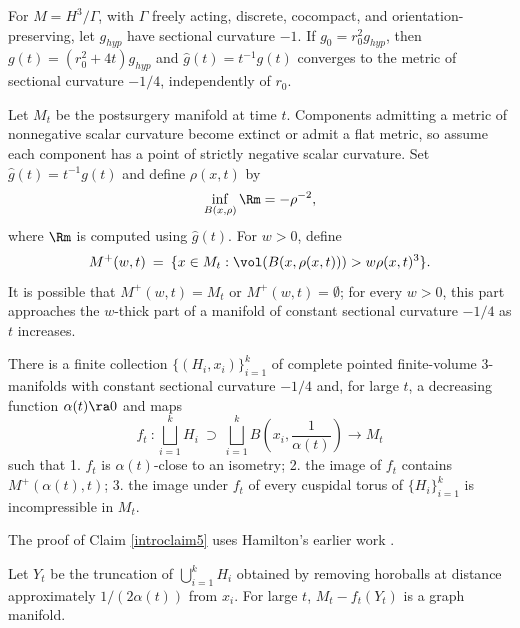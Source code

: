 For $M=H^3/\Gamma$, with $\Gamma$ freely acting, discrete, cocompact, and
orientation-preserving, let $g_{hyp}$ have sectional curvature $-1$.  If
$g_0=r_0^2g_{hyp}$, then
$g(t)=(r_0^2+4t)g_{hyp}$ and
$\widehat g(t)=t^{-1}g(t)$ converges to the metric of sectional curvature
$-1/4$, independently of $r_0$.

Let $M_t$ be the postsurgery manifold at time $t$.  Components admitting a
metric of nonnegative scalar curvature become extinct or admit a flat metric,
so assume each component has a point of strictly negative scalar curvature.
Set $\widehat g(t)=t^{-1}g(t)$ and define $\rho(x,t)$ by
\[
\inf_{B(x,\rho)}\Rm=-\rho^{-2},
\]
where $\Rm$ is computed using $\widehat g(t)$.  For $w>0$, define
\begin{equation}
M^+(w,t)\: =\:
\{x\in M_t:\vol(B(x,\rho(x,t)))>w\rho(x,t)^3\}.
\end{equation}
It is possible that $M^+(w,t)=M_t$ or $M^+(w,t)=\emptyset$; for every
$w>0$, this part approaches the $w$-thick part of a manifold of constant
sectional curvature $-1/4$ as $t$ increases.

\begin{proposition}
  \label{prop:kl-overview-ricci-flow-approach-manifold-geometrization-existence-sectional-curvature}
 \cite{Perelman2} \label{introclaim5}
There is a finite collection $\{(H_i,x_i)\}_{i=1}^k$ of complete pointed
finite-volume $3$-manifolds with constant sectional curvature $-1/4$ and, for
large $t$, a decreasing function $\alpha(t)\ra0$ and maps
\begin{equation}
f_t\: :\bigsqcup_{i=1}^kH_i\:\supset\:
\bigsqcup_{i=1}^k B\left(x_i,\frac{1}{\alpha(t)}\right)\longrightarrow M_t
\end{equation}
such that
1. $f_t$ is $\alpha(t)$-close to an isometry;
2. the image of $f_t$ contains $M^+(\alpha(t),t)$;
3. the image under $f_t$ of every cuspidal torus of $\{H_i\}_{i=1}^k$ is
incompressible in $M_t$.
\end{proposition}

The proof of Claim \ref{introclaim5} uses Hamilton's earlier work
\cite{Hamiltonn}.

\begin{proposition}
  \label{prop:kl-overview-ricci-flow-approach-manifold-geometrization-graph-manifolds-proposition}
 \cite{Perelman2,Shioya-Yamaguchi} \label{introclaim6}
Let $Y_t$ be the truncation of $\bigcup_{i=1}^kH_i$ obtained by removing
horoballs at distance approximately $1/(2\alpha(t))$ from $x_i$.  For large
$t$, $M_t-f_t(Y_t)$ is a graph manifold.
\end{proposition}

